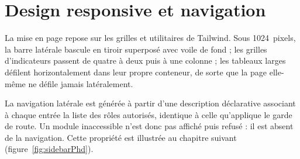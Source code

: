 \section{Design responsive et navigation}

La mise en page repose sur les grilles et utilitaires de Tailwind. Sous 1024~pixels, la
barre latérale bascule en tiroir superposé avec voile de fond ; les grilles d'indicateurs
passent de quatre à deux puis à une colonne ; les tableaux larges défilent horizontalement
dans leur propre conteneur, de sorte que la page elle-même ne défile jamais latéralement.

La navigation latérale est générée à partir d'une description déclarative associant à
chaque entrée la liste des rôles autorisés, identique à celle qu'applique le garde de
route. Un module inaccessible n'est donc pas affiché puis refusé : il est absent de la
navigation. Cette propriété est illustrée au chapitre suivant
(figure~\ref{fig:sidebarPhd}).

